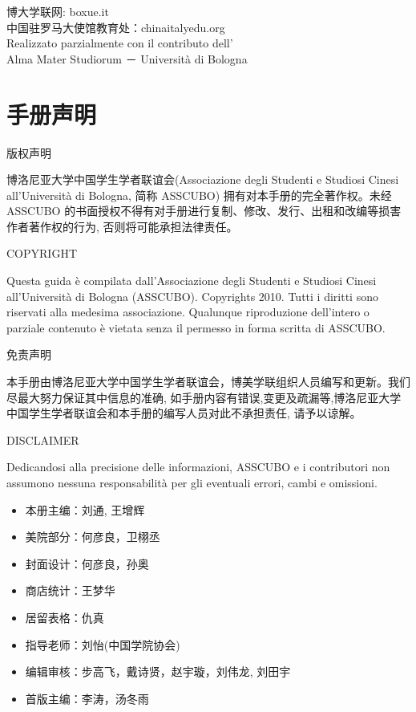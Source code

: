 \documentclass[3pt,a5paper,openright,twoside]{book}
\begin{document}
\begin{titlepage}
\vspace*{0.8cm}
\begin{center}
博大学联网: boxue.it\\
中国驻罗马大使馆教育处：chinaitalyedu.org\\
Realizzato parzialmente con il contributo dell'\\
Alma Mater Studiorum － Universit\`a di Bologna
\end{center}

\newpage


\topmargin=-2cm                        %

\chapter*{手册声明}                 %
\pagestyle{empty}%
\thispagestyle{empty} 

\vspace{0.3cm}\centerline{\Large 版权声明}
博洛尼亚大学中国学生学者联谊会(Associazione degli Studenti e Studiosi 
Cinesi all’Università di Bologna, 简称 ASSCUBO) 拥有对本手册的完全著作权。未经 ASSCUBO 的书面授权不得有对手册进行复制、修改、发行、出租和改编等损害作者著作权的行为, 否则将可能承担法律责任。 

\vspace{0.3cm}\centerline{\Large COPYRIGHT}
Questa guida è compilata dall’Associazione degli Studenti e Studiosi Cinesi all’Università di Bologna (ASSCUBO). Copyrights 2010. Tutti i diritti sono riservati alla medesima associazione. Qualunque riproduzione dell’intero o parziale contenuto è vietata senza il permesso in forma scritta di ASSCUBO. 

\vspace{0.3cm}\centerline{\Large 免责声明}
本手册由博洛尼亚大学中国学生学者联谊会，博美学联组织人员编写和更新。我们尽最大努力保证其中信息的准确, 如手册内容有错误,变更及疏漏等,博洛尼亚大学中国学生学者联谊会和本手册的编写人员对此不承担责任, 请予以谅解。 

\vspace{0.3cm}\centerline{\Large DISCLAIMER}
Dedicandosi alla precisione delle informazioni, ASSCUBO e i contributori non assumono nessuna responsabilità per gli eventuali errori, cambi e omissioni. 

\vspace{0.8cm}
\begin{itemize}
\item[] 本册主编：刘通, 王增辉
\item[] 美院部分：何彦良，卫栩丞
\item[] 封面设计：何彦良，孙奥
\item[] 商店统计：王梦华
\item[] 居留表格：仇真
\item[] 指导老师：刘怡(中国学院协会)
\item[] 编辑审核：步高飞，戴诗贤，赵宇璇，刘伟龙, 刘田宇
\item[] 首版主编：李涛，汤冬雨
\end{itemize}



\end{titlepage}
\end{document}
